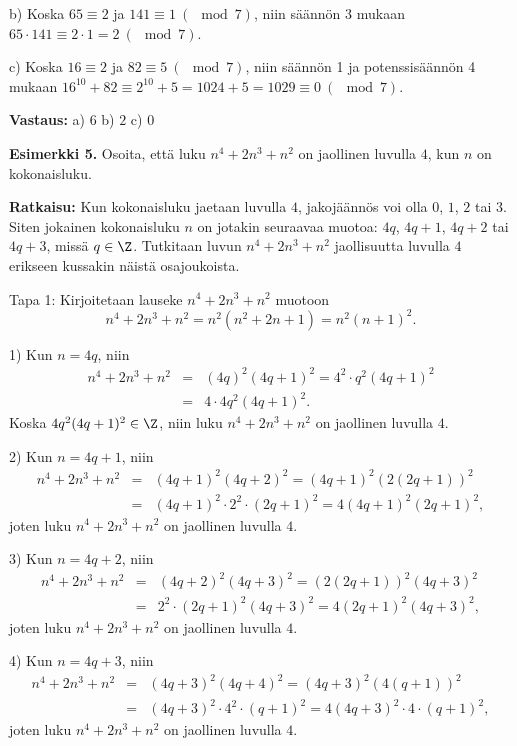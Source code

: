 b)
Koska $65 \equiv 2$ ja $141 \equiv 1 \ (\mod 7)$, niin säännön 3 mukaan $65 \cdot 141 \equiv 2 \cdot 1 = 2 \ (\mod 7)$.

c)
Koska $16 \equiv 2$ ja $82 \equiv 5 \ (\mod 7)$, niin säännön 1 ja potenssisäännön 4 mukaan
$16^{10} + 82 \equiv 2^{10} + 5 = 1024 + 5 = 1029 \equiv 0 \ (\mod 7)$.

{\bf Vastaus:} a) $6$ b) $2$ c) $0$


{\bf Esimerkki 5.} Osoita, että luku $n^4 + 2n^3 + n^2$ on
jaollinen luvulla $4$, kun $n$ on kokonaisluku.

{\bf Ratkaisu:}
Kun kokonaisluku jaetaan luvulla $4$, jakojäännös voi olla $0$,
$1$, $2$ tai $3$. Siten jokainen kokonaisluku $n$ on jotakin
seuraavaa muotoa: $4q$, $4q + 1$, $4q + 2$ tai $4q + 3$, missä
$q\in\Z$. Tutkitaan luvun $n^4 + 2n^3 + n^2$ jaollisuutta luvulla
$4$ erikseen kussakin näistä osajoukoista.

Tapa 1: Kirjoitetaan lauseke $n^4 + 2n^3 + n^2$ muotoon
\[
n^4 + 2n^3 + n^2 = n^2 (n^2 + 2n + 1) = n^2 (n + 1)^2.
\]

1) Kun $n = 4q$, niin
\begin{eqnarray*}
n^4 + 2n^3 + n^2 &=& (4q)^2(4q + 1)^2 = 4^2 \cdot q^2 (4q + 1)
^2\\
&=& 4 \cdot 4q^2 (4q + 1)^2.
\end{eqnarray*}
Koska $4q^2 (4q + 1)^2 \in \Z$, niin luku $n^4 + 2n^3 + n^2$ on jaollinen luvulla $4$.

2) Kun $n = 4q + 1$, niin
\begin{eqnarray*}
n^4 + 2n^3 + n^2 &=& (4q+1)^2(4q + 2)^2 = (4q+1)^2 (2(2q + 1))
^2\\
&=& (4q+1)^2 \cdot 2^2 \cdot (2q + 1)^2 = 4(4q+1)^2 (2q + 1)^2,
\end{eqnarray*}
joten luku $n^4 + 2n^3 + n^2$ on jaollinen luvulla $4$.

3) Kun $n = 4q + 2$, niin
\begin{eqnarray*}
n^4 + 2n^3 + n^2 &=& (4q+2)^2(4q + 3)^2 = (2(2q+1))^2 (4q + 3)
^2\\
&=& 2^2 \cdot (2q+1)^2 (4q + 3)^2 = 4(2q+1)^2 (4q + 3)^2,
\end{eqnarray*}
joten luku $n^4 + 2n^3 + n^2$ on jaollinen luvulla $4$.

4) Kun $n = 4q + 3$, niin
\begin{eqnarray*}
n^4 + 2n^3 + n^2 &=& (4q+3)^2(4q + 4)^2 = (4q+3)^2 (4(q + 1))^2\\
&=& (4q+3)^2 \cdot 4^2 \cdot (q + 1)^2 = 4(4q+3)^2 \cdot 4 \cdot
(q + 1)^2,
\end{eqnarray*}
joten luku $n^4 + 2n^3 + n^2$ on jaollinen luvulla $4$.

